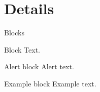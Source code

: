 \documentclass{beamer}
\begin{document}
    \section{Details}
    \begin{frame}{Blocks}
        \begin{block}{Block}
            Text.
        \end{block}
        \pause
        \begin{alertblock}{Alert block}
            Alert \alert{text}.
        \end{alertblock}
        \pause
        \begin{exampleblock}{Example block}
            Example \textcolor{example}{text}.
        \end{exampleblock}
    \end{frame}
    
\end{document}
